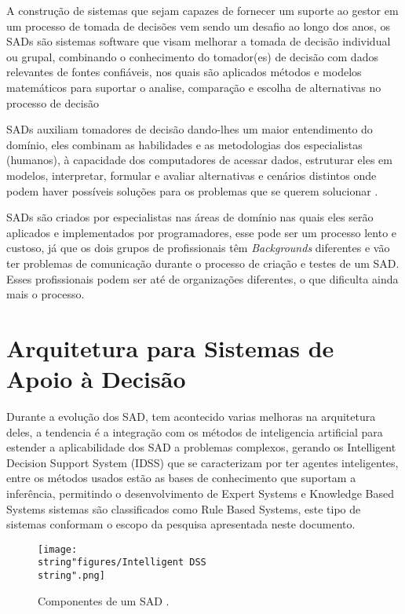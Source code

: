 A construção de sistemas que sejam capazes de fornecer um suporte
ao gestor em um processo de tomada de decisões vem sendo um desafio
ao longo dos anos, os SADs são sistemas software que visam melhorar
a tomada de decisão individual ou grupal, combinando o conhecimento
do tomador(es) de decisão com dados relevantes de fontes confiáveis,
nos quais são aplicados métodos e modelos matemáticos para suportar
o analise, comparação e escolha de alternativas no processo de decisão
\citet{Tweedale2016} 

SADs auxiliam tomadores de decisão dando-lhes um maior entendimento
do domínio, eles combinam as habilidades e as metodologias dos especialistas
(humanos)\citet{heinzle2010semantica}, à capacidade dos computadores
de acessar dados, estruturar eles em modelos, interpretar, formular
e avaliar alternativas e cenários distintos onde podem haver possíveis
soluções para os problemas que se querem solucionar \citet{lu2006application}.

SADs são criados por especialistas nas áreas de domínio nas quais
eles serão aplicados e implementados por programadores, esse pode
ser um processo lento e custoso, já que os dois grupos de profissionais
têm \foreignlanguage{english}{\emph{Backgrounds}} diferentes e vão
ter problemas de comunicação durante o processo de criação e testes
de um SAD. Esses profissionais podem ser até de organizações diferentes,
o que dificulta ainda mais o processo.

\section{Arquitetura para Sistemas de Apoio à Decisão}

Durante a evolução dos SAD, tem acontecido varias melhoras na arquitetura
deles, a tendencia é a integração com os métodos de inteligencia artificial
para estender a aplicabilidade dos SAD a problemas complexos, gerando
os \foreignlanguage{english}{Intelligent Decision Support System (IDSS)}
que se caracterizam por ter agentes inteligentes, entre os métodos
usados estão as bases de conhecimento que suportam a inferência, permitindo
o desenvolvimento de \foreignlanguage{english}{Expert Systems} e \foreignlanguage{english}{Knowledge
Based Systems} sistemas são classificados como \foreignlanguage{english}{Rule
Based Systems}\citet{Tweedale2016}, este tipo de sistemas conformam
o escopo da pesquisa apresentada neste documento.

\begin{figure}[H]
\noindent \begin{centering}
\texttt{[image: \\string"figures/Intelligent DSS\\string".png]}
\par\end{centering}
\caption{Componentes de um SAD .\label{fig:Componentes-SAD}}
\end{figure}

